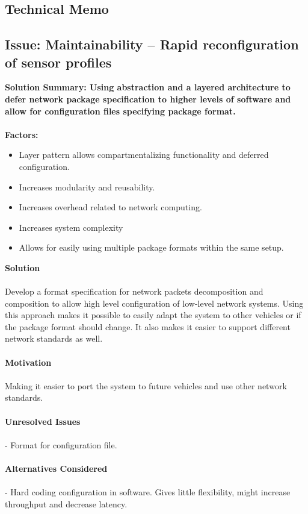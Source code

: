 \subsection*{Technical Memo}
\subsection{Issue: Maintainability -- Rapid reconfiguration of sensor profiles
}
\textbf{Solution Summary: Using abstraction and a layered architecture to defer
network package specification to higher levels of software and allow for
configuration files specifying package format.\\
\\
Factors:}
\begin{itemize}
\item Layer pattern allows compartmentalizing functionality and deferred
configuration. 
\item Increases modularity and reusability.
\item Increases overhead related to network computing.
\item Increases system complexity
\item Allows for easily using multiple package formats within the same
setup.
\end{itemize}
\textbf{Solution}\\
\\
Develop a format specification for network packets decomposition and
composition to allow high level configuration of low-level network systems.
Using this approach makes it possible to easily adapt the system to other
vehicles or if the package format should change. It also makes it easier to
support different network standards as well.\\
\\
\textbf{Motivation}\\
\\
Making it easier to port the system to future vehicles and use other network
standards.\\
\\
\textbf{Unresolved Issues}\\
\\
- Format for configuration file.\\
\\
\textbf{Alternatives Considered}\\
\\
- Hard coding configuration in software. Gives little flexibility,
might increase throughput and decrease latency. \\



